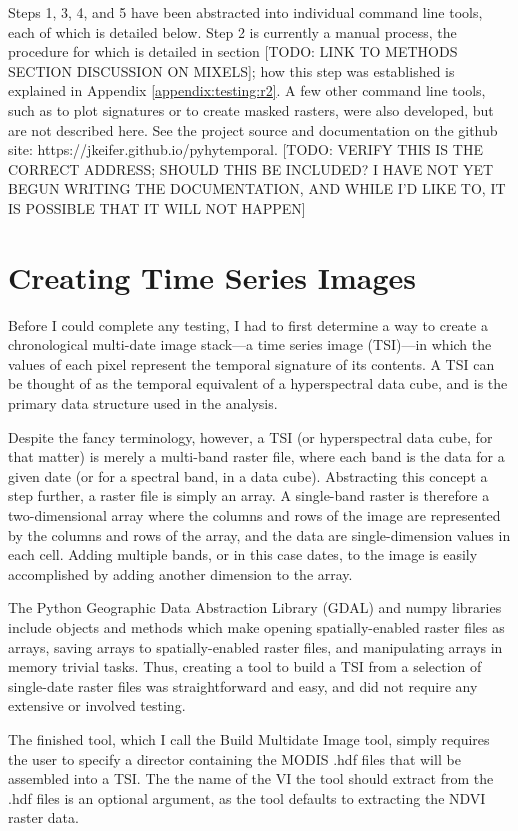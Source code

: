 Steps 1, 3, 4, and 5 have been abstracted into individual command line tools, each of which is detailed below. Step 2 is currently a manual process, the procedure for which is detailed in section [TODO: LINK TO METHODS SECTION DISCUSSION ON MIXELS]; how this step was established is explained in Appendix \ref{appendix:testing:r2}. A few other command line tools, such as to plot signatures or to create masked rasters, were also developed, but are not described here. See the project source and documentation on the github site: https://jkeifer.github.io/pyhytemporal. [TODO: VERIFY THIS IS THE CORRECT ADDRESS; SHOULD THIS BE INCLUDED? I HAVE NOT YET BEGUN WRITING THE DOCUMENTATION, AND WHILE I'D LIKE TO, IT IS POSSIBLE THAT IT WILL NOT HAPPEN]

\section{Creating Time Series Images}
\label{appendix:tools:build}

Before I could complete any testing, I had to first determine a way to create a chronological multi-date image stack---a time series image (TSI)---in which the values of each pixel represent the temporal signature of its contents. A TSI can be thought of as the temporal equivalent of a hyperspectral data cube, and is the primary data structure used in the analysis.

Despite the fancy terminology, however, a TSI (or hyperspectral data cube, for that matter) is merely a multi-band raster file, where each band is the data for a given date (or for a spectral band, in a data cube). Abstracting this concept a step further, a raster file is simply an array. A single-band raster is therefore a two-dimensional array where the columns and rows of the image are represented by the columns and rows of the array, and the data are single-dimension values in each cell. Adding multiple bands, or in this case dates, to the image is easily accomplished by adding another dimension to the array.

The Python Geographic Data Abstraction Library (GDAL) and numpy libraries include objects and methods which make opening spatially-enabled raster files as arrays, saving arrays to spatially-enabled raster files, and manipulating arrays in memory trivial tasks. Thus, creating a tool to build a TSI from a selection of single-date raster files was straightforward and easy, and did not require any extensive or involved testing.

The finished tool, which I call the Build Multidate Image tool, simply requires the user to specify a director containing the MODIS .hdf files that will be assembled into a TSI. The the name of the VI the tool should extract from the .hdf files is an optional argument, as the tool defaults to extracting the NDVI raster data.

